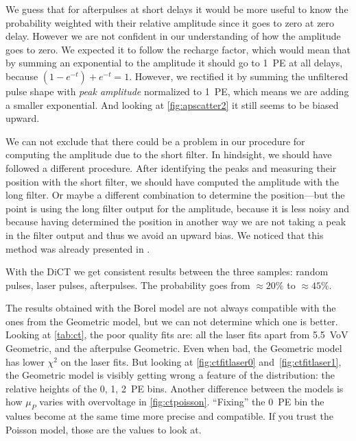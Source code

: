 We guess that for afterpulses at short delays it would be more useful to know
the probability weighted with their relative amplitude since it goes to zero at
zero delay. However we are not confident in our understanding of how the
amplitude goes to zero. We expected it to follow the recharge factor, which
would mean that by summing an exponential to the amplitude it should go to 1~PE
at all delays, because $(1-e^{-t})+e^{-t} = 1$. However, we rectified it by
summing the unfiltered pulse shape with \emph{peak amplitude} normalized to
1~PE, which means we are adding a smaller exponential. And looking at
\autoref{fig:apscatter2} it still seems to be biased upward.

We can not exclude that there could be a problem in our procedure for computing
the amplitude due to the short filter. In hindsight, we should have followed a
different procedure. After identifying the peaks and measuring their position
with the short filter, we should have computed the amplitude with the long
filter. Or maybe a different combination to determine the position---but the
point is using the long filter output for the amplitude, because it is less
noisy and because having determined the position in another way we are not
taking a peak in the filter output and thus we avoid an upward bias. We noticed
that this method was already presented in \cite{krikler2020}.


With the DiCT we get consistent results between the three samples: random
pulses, laser pulses, afterpulses. The probability goes from $\approx\SI{20}\%$
to $\approx\SI{45}\%$.


The results obtained with the Borel model are not always compatible with the
ones from the Geometric model, but we can not determine which one is better.
Looking at \autoref{tab:ct}, the poor quality fits are: all the laser fits
apart from \SI{5.5}{VoV} Geometric, and the afterpulse Geometric. Even when
bad, the Geometric model has lower $\chi^2$ on the laser fits. But looking at
\autoref{fig:ctfitlaser0} and~\ref{fig:ctfitlaser1}, the Geometric model is
visibly getting wrong a feature of the distribution: the relative heights of
the 0, 1, 2~PE bins. Another difference between the models is how $\mu_P$
varies with overvoltage in \autoref{fig:ctpoisson}. ``Fixing'' the 0~PE bin the
values become at the same time more precise and compatible. If you trust the
Poisson model, those are the values to look at.

